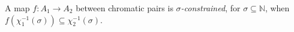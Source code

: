 
A map $f:A_1\to A_2$ between chromatic pairs is \emph{$\sigma$-constrained}, for $\sigma\subseteq\mathbb N$, when $f(\chi_1^{-1}(\sigma))\subseteq\chi_2^{-1}(\sigma)$.
